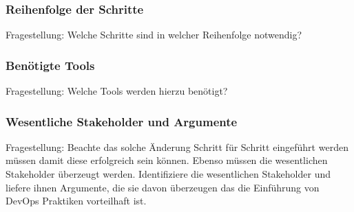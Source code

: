 

\subsubsection{Reihenfolge der Schritte}

Fragestellung: Welche Schritte sind in welcher Reihenfolge notwendig?



\subsubsection{Benötigte Tools}

Fragestellung: Welche Tools werden hierzu benötigt?

\subsubsection{Wesentliche Stakeholder und Argumente}

Fragestellung: Beachte das solche Änderung Schritt für Schritt eingeführt werden müssen damit diese
erfolgreich sein können. Ebenso müssen die wesentlichen Stakeholder überzeugt werden.
Identifiziere die wesentlichen Stakeholder und liefere ihnen Argumente, die sie davon
überzeugen das die Einführung von DevOps Praktiken vorteilhaft ist.


